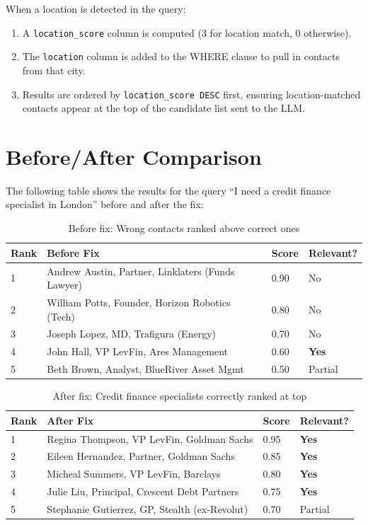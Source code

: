 \documentclass[12pt, a4paper]{report}
\begin{document}
When a location is detected in the query:
\begin{enumerate}[itemsep=3pt]
    \item A \texttt{location\_score} column is computed (3 for location match, 0 otherwise).
    \item The \texttt{location} column is added to the WHERE clause to pull in contacts from that city.
    \item Results are ordered by \texttt{location\_score DESC} first, ensuring location-matched contacts appear at the top of the candidate list sent to the LLM.
\end{enumerate}

\section{Before/After Comparison}

The following table shows the results for the query ``I need a credit finance specialist in London'' before and after the fix:

\begin{table}[H]
\centering
\begin{tabular}{p{2.5cm}p{5cm}p{2cm}p{2cm}}
\toprule
\textbf{Rank} & \textbf{Before Fix} & \textbf{Score} & \textbf{Relevant?} \\
\midrule
1 & Andrew Austin, Partner, Linklaters (Funds Lawyer) & 0.90 & No \\
2 & William Potts, Founder, Horizon Robotics (Tech) & 0.80 & No \\
3 & Joseph Lopez, MD, Trafigura (Energy) & 0.70 & No \\
4 & John Hall, VP LevFin, Ares Management & 0.60 & \textbf{Yes} \\
5 & Beth Brown, Analyst, BlueRiver Asset Mgmt & 0.50 & Partial \\
\bottomrule
\end{tabular}
\caption{Before fix: Wrong contacts ranked above correct ones}
\end{table}

\begin{table}[H]
\centering
\begin{tabular}{p{2.5cm}p{5cm}p{2cm}p{2cm}}
\toprule
\textbf{Rank} & \textbf{After Fix} & \textbf{Score} & \textbf{Relevant?} \\
\midrule
1 & Regina Thompson, VP LevFin, Goldman Sachs & 0.95 & \textbf{Yes} \\
2 & Eileen Hernandez, Partner, Goldman Sachs & 0.85 & \textbf{Yes} \\
3 & Micheal Summers, VP LevFin, Barclays & 0.80 & \textbf{Yes} \\
4 & Julie Liu, Principal, Crescent Debt Partners & 0.75 & \textbf{Yes} \\
5 & Stephanie Gutierrez, GP, Stealth (ex-Revolut) & 0.70 & Partial \\
\bottomrule
\end{tabular}
\caption{After fix: Credit finance specialists correctly ranked at top}
\end{table}
\end{document}
